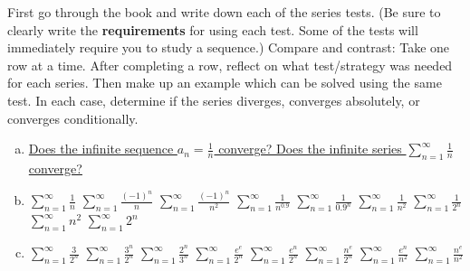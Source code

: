\documentclass{article}
\begin{document}
\pagestyle{fancy}

\noindent
First go through the book and write down each of the series tests. (Be sure to clearly write the {\bf requirements} for using each test. Some of the tests will immediately require you to study a sequence.) Compare and contrast: Take one row at a time. After completing a row, reflect on what test/strategy was needed for each series. Then make up an example which can be solved using the same test. In each case, determine if the series diverges, converges absolutely, or converges conditionally.

\begin{enumerate}[(a)]

\item\quad
\href{https://edward-kim-math.github.io/key/series/a1.pdf}{Does the infinite sequence $\displaystyle a_n = \frac1n$ converge?
Does the infinite series $\displaystyle \sum_{n=1}^\infty \frac1n$ converge?}

\vfill

\item \quad 
\href{https://edward-kim-math.github.io/key/series/b1.pdf}{$\displaystyle \sum_{n=1}^\infty \frac1n$} %
\quad
\href{https://edward-kim-math.github.io/key/series/b2.pdf}{$\displaystyle \sum_{n=1}^\infty \frac{(-1)^n}n$} %
\quad
\href{https://edward-kim-math.github.io/key/series/b3.pdf}{$\displaystyle \sum_{n=1}^\infty \frac{(-1)^n}{n^2}$} %
\quad
\href{https://edward-kim-math.github.io/key/series/b4.pdf}{$\displaystyle \sum_{n=1}^\infty \frac1{n^{0.9}}$} %
\quad
\href{https://edward-kim-math.github.io/key/series/b5.pdf}{$\displaystyle \sum_{n=1}^\infty \frac1{0.9^n}$}
\quad
\href{https://edward-kim-math.github.io/key/series/b6.pdf}{$\displaystyle \sum_{n=1}^\infty \frac1{n^2}$}
\quad
\href{https://edward-kim-math.github.io/key/series/b7.pdf}{$\displaystyle \sum_{n=1}^\infty \frac1{2^n}$}
\quad
\href{https://edward-kim-math.github.io/key/series/b8.pdf}{$\displaystyle \sum_{n=1}^\infty n^2$}
\quad
\href{https://edward-kim-math.github.io/key/series/b9.pdf}{$\displaystyle \sum_{n=1}^\infty 2^n$}

\vfill

\item\quad
\href{https://edward-kim-math.github.io/key/series/c1.pdf}{$\displaystyle\sum_{n=1}^\infty \frac{3}{2^n}$}
\quad
\href{https://edward-kim-math.github.io/key/series/c2.pdf}{$\displaystyle\sum_{n=1}^\infty \frac{3^n}{2^n}$}
\quad
\href{https://edward-kim-math.github.io/key/series/c3.pdf}{$\displaystyle\sum_{n=1}^\infty \frac{2^n}{3^n}$}
\quad
\href{https://edward-kim-math.github.io/key/series/c4.pdf}{$\displaystyle\sum_{n=1}^\infty \frac{e^e}{2^n}$}
\quad
\href{https://edward-kim-math.github.io/key/series/c5.pdf}{$\displaystyle\sum_{n=1}^\infty \frac{e^n}{2^n}$}
\quad
\href{https://edward-kim-math.github.io/key/series/c6.pdf}{$\displaystyle\sum_{n=1}^\infty \frac{n^e}{2^n}$}
\quad
\href{https://edward-kim-math.github.io/key/series/c7.pdf}{$\displaystyle\sum_{n=1}^\infty \frac{e^n}{n^2}$}
\quad
\href{https://edward-kim-math.github.io/key/series/c8.pdf}{$\displaystyle\sum_{n=1}^\infty \frac{n^e}{n^2}$}
\quad


\end{enumerate}
\end{document}
